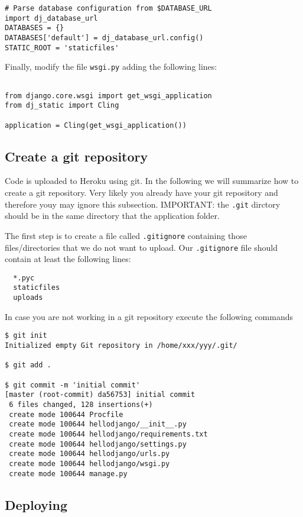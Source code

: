 \documentclass[12pt]{article} %
\begin{document}
\footnotesize
\begin{verbatim}
# Parse database configuration from $DATABASE_URL
import dj_database_url
DATABASES = {} 
DATABASES['default'] = dj_database_url.config()
STATIC_ROOT = 'staticfiles'
\end{verbatim}
\normalfont

Finally, modify the file \texttt{wsgi.py} adding the following lines:
\begin{verbatim}
 
from django.core.wsgi import get_wsgi_application
from dj_static import Cling
 
application = Cling(get_wsgi_application())
\end{verbatim}


\subsection{Create a git repository}
Code is uploaded to Heroku using git. In the following we will summarize how to create a git repository. Very likely you already have your git repository and therefore youy may ignore this subsection. IMPORTANT: the \texttt{.git} dirctory should be in the same directory that the application folder.

The first step is to create a file called \texttt{.gitignore} containing those files/directories 
that we do not want to upload. Our \texttt{.gitignore} file should contain at least the following lines:

\begin{verbatim}
  *.pyc
  staticfiles
  uploads
\end{verbatim}

In case you are not working in a git repository execute the following commands

\begin{verbatim}
$ git init 
Initialized empty Git repository in /home/xxx/yyy/.git/ 
 
$ git add . 
 
$ git commit -m 'initial commit'
[master (root-commit) da56753] initial commit 
 6 files changed, 128 insertions(+) 
 create mode 100644 Procfile 
 create mode 100644 hellodjango/__init__.py 
 create mode 100644 hellodjango/requirements.txt 
 create mode 100644 hellodjango/settings.py 
 create mode 100644 hellodjango/urls.py 
 create mode 100644 hellodjango/wsgi.py 
 create mode 100644 manage.py 
\end{verbatim}

\subsection{Deploying}
\end{document}
